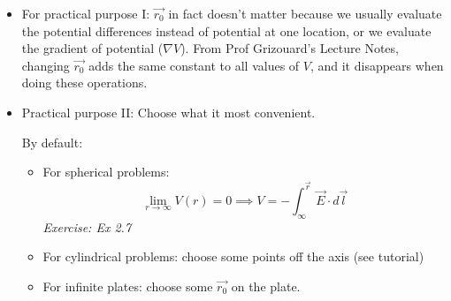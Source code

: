 \documentclass[12pt,a4paper,twoside]{article}
\numberwithin{equation}{section}
\begin{document}
    \begin{itemize}
        \item For practical purpose I: $\overrightarrow{r_0}$ in fact doesn't matter because we usually evaluate the potential differences instead of potential at one location, or we evaluate the gradient of potential ($\nabla V$).
        From Prof Grizouard's Lecture Notes, changing $\overrightarrow{r_0}$ adds the same constant to all values of $V$, and it disappears when doing these operations.
        
        \item Practical purpose II: Choose what it most convenient.
        
        By default:
        \begin{itemize}
            \item For spherical problems:
            \[\lim_{r\to\infty}V(r)=0\implies V=-\int_{\infty}^{\overrightarrow{r}}\overrightarrow{E}\cdot d\overrightarrow{l}\]
                \textit{Exercise: Ex 2.7}
            \item For cylindrical problems: choose some points off the axis (see tutorial)
            \item For infinite plates: choose some $\overrightarrow{r_0}$ on the plate.
        \end{itemize}
    
    \end{itemize}
\end{document}
